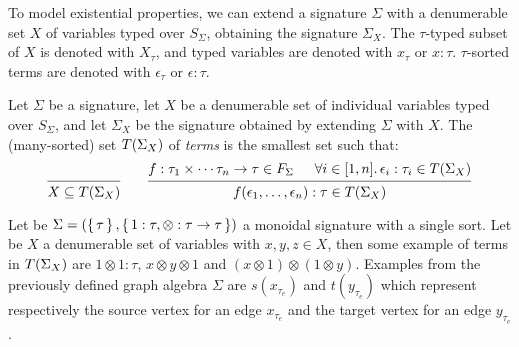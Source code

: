 To model existential properties, we can extend a signature $\Sigma$ with a denumerable set $X$ of variables typed over
$S_\Sigma$, obtaining the signature $\Sigma_X$. The $\tau$-typed subset of $X$ is denoted with $X_\tau$, and typed
variables are denoted with $x_\tau$ or $x : \tau$. $\tau$-sorted terms are denoted with $\epsilon_\tau$ or $\epsilon :
\tau$.

\begin{definition}[Term]
  Let $\Sigma$ be a signature, let $X$ be a denumerable set of individual variables typed over $S_\Sigma$, and let
  $\Sigma_X$ be the signature obtained by extending $\Sigma$ with $X$. The (many-sorted) set $T({\Sigma}_{X})$ of
  \emph{terms} is the smallest set such that:
  \[
    \begin{prooftree}
      \hypo{\phantom{[1,n]}} %
      \infer1{X \subseteq \terms{\Sigma}{X}}
    \end{prooftree}
    \qquad
    \begin{prooftree}
      \hypo{f : \tau_1 \times \cdots \tau_n \to \tau \in F_\Sigma}
      \hypo{\forall i \in [1,n] \ldotp \epsilon_i : \tau_i \in \terms{\Sigma}{X}}
      \infer2{f(\epsilon_1, \ldots, \epsilon_n) : \tau \in \terms{\Sigma}{X}}
    \end{prooftree}
  \]
\end{definition}

\begin{example}[Terms]
  Let be $\Sigma = (\set{\tau}, \set{1 : \tau, \otimes : \tau \to \tau})$ a monoidal signature with a single sort. Let
  be $X$ a denumerable set of variables with $x, y, z \in X$, then some example of terms in
  $T({\Sigma}_{X})$ are $1 \otimes 1 : \tau$, $x \otimes y \otimes 1$ and $(x \otimes 1) \otimes (1
  \otimes y)$. Examples from the previously defined graph algebra $\Sigma$ are $s(x_{\tau_e})$ and $t(y_{\tau_e})$ which
  represent respectively the source vertex for an edge $x_{\tau_e}$ and the target vertex for an edge $y_{\tau_e}$.
\end{example}
